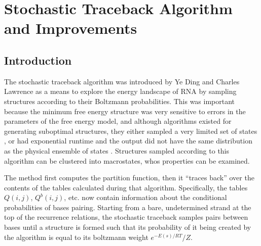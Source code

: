 \chapter{Stochastic Traceback Algorithm and Improvements}

\section{Introduction}

The stochastic traceback algorithm was introduced by Ye Ding and
Charles Lawrence \cite{ding2003statistical} as a means to explore the
energy landscape of RNA by sampling structures according to their
Boltzmann probabilities. This was important because the minimum free
energy structure was very sensitive to errors in the parameters of the
free energy model, and although algorithms existed for generating
suboptimal structures, they either sampled a very limited set of
states \cite{zuker1989finding}, or had exponential runtime and the
output did not have the same distribution as the physical ensemble of
states \cite{wuchty199complete}. Structures sampled according to this
algorithm can be clustered into macrostates, whos properties can be
examined.

The method first computes the partition function, then it ``traces
back'' over the contents of the tables calculated during that
algorithm. Specifically, the tables $Q(i,j)$, $Q^b(i,j)$, etc. now
contain information about the conditional probabilities of bases
pairing. Starting from a bare, undetermined strand at the top of the
recurrence relations, the stochastic traceback samples pairs between
bases until a structure is formed such that its probability of it
being created by the algorithm is equal to its boltzmann weight
$e^{-E(s)/RT}/Z$.

